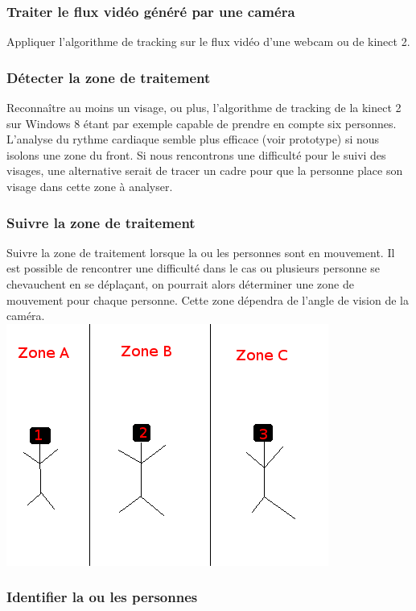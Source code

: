 \documentclass[12pt,a4paper]{article}
\begin{document}
\subsubsection{Traiter le flux vidéo généré par une caméra}

Appliquer l'algorithme de tracking sur le flux vidéo d'une webcam ou de kinect 2.

\subsubsection{Détecter la zone de traitement}

Reconnaître au moins un visage, ou plus, l'algorithme de tracking de la kinect 2 sur Windows 8 étant par exemple capable de prendre en compte six personnes.
L'analyse du rythme cardiaque semble plus efficace (voir prototype) si nous isolons une zone du front.
Si nous rencontrons une difficulté pour le suivi des visages, une alternative serait de tracer un cadre pour que la personne place son visage dans cette zone à analyser.

\subsubsection{Suivre la zone de traitement}

Suivre la zone de traitement lorsque la ou les personnes sont en mouvement. Il est possible de rencontrer une difficulté dans le cas ou plusieurs personne se chevauchent en se déplaçant, on pourrait alors déterminer une zone de mouvement pour chaque personne. Cette zone dépendra de l'angle de vision de la caméra.\\

\includegraphics[scale=0.75]{zone_mouvement.png}

\subsubsection{Identifier la ou les personnes}
\end{document}
